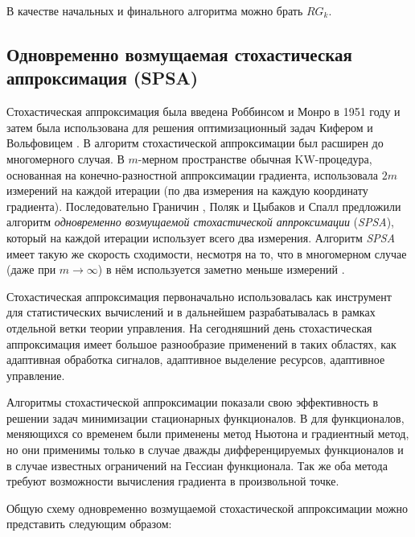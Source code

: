 В качестве начальных и финального алгоритма можно брать $RG_k$.



\subsection[Одновременно возмущаемая стохастическая аппроксимация (SPSA)]{Одновременно возмущаемая стохастическая\\ аппроксимация (SPSA)}
Стохастическая аппроксимация была введена Роббинсом и Монро в 1951 году \cite{Robbins&Monro:1951} и затем была использована для решения оптимизационный задач Кифером и Вольфовицем \cite{Kiefer&Wolfowitz:1952}. В \cite{Blum:1954} алгоритм стохастической аппроксимации был расширен до многомерного случая. В $m$-мерном пространстве обычная KW-процедура, основанная на конечно-разностной аппроксимации градиента, использовала $2m$ измерений на каждой итерации (по два измерения на каждую координату градиента). Последовательно Граничин \cite{Граничин:1989}, Поляк и Цыбаков \cite{Поляк&Цыбаков:1990} и Спалл \cite{Spall:1992} предложили алгоритм \emph{одновременно возмущаемой стохастической аппроксимации} (\emph{SPSA}), который на каждой итерации использует всего два измерения. Алгоритм \emph{SPSA} имеет такую же скорость сходимости, несмотря на то, что в многомерном случае (даже при $m \to \infty$) в нём используется заметно меньше измерений \cite{Spall:2005}.

Стохастическая аппроксимация первоначально использовалась как инструмент для статистических вычислений и в дальнейшем разрабатывалась в рамках отдельной ветки теории управления. На сегодняшний день стохастическая аппроксимация имеет большое разнообразие применений в таких областях, как адаптивная обработка сигналов, адаптивное выделение ресурсов, адаптивное управление.

Алгоритмы стохастической аппроксимации показали свою эффективность в решении задач минимизации стационарных функционалов. В \cite{Polyak:1987} для функционалов, меняющихся со временем были применены метод Ньютона и градиентный метод, но они применимы только в случае дважды дифференцируемых функционалов и в случае известных ограничений на Гессиан функционала. Так же оба метода требуют возможности вычисления градиента в произвольной точке.

Общую схему одновременно возмущаемой стохастической аппроксимации можно представить следующим образом:

